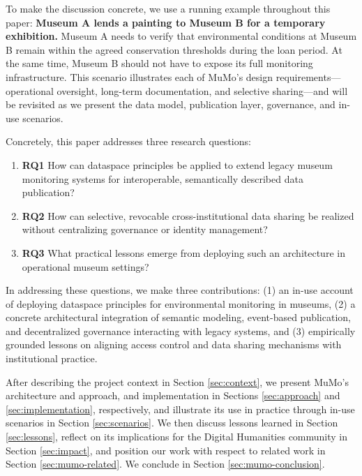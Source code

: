 To make the discussion concrete, we use a running example throughout
this paper: \textbf{Museum A lends a painting to Museum B for a
temporary exhibition.} Museum A needs to verify that environmental
conditions at Museum B remain within the agreed conservation thresholds
during the loan period. At the same time, Museum B should not have to
expose its full monitoring infrastructure. This scenario illustrates
each of MuMo's design requirements---operational oversight, long-term
documentation, and selective sharing---and will be revisited as we
present the data model, publication layer, governance, and in-use
scenarios.

Concretely, this paper addresses three research questions:

\begin{enumerate}
\def\labelenumi{\arabic{enumi}.}
\tightlist
\item
  \textbf{RQ1} How can dataspace principles be applied to extend legacy
  museum monitoring systems for interoperable, semantically described
  data publication?
\item
  \textbf{RQ2} How can selective, revocable cross-institutional data
  sharing be realized without centralizing governance or identity
  management?
\item
  \textbf{RQ3} What practical lessons emerge from deploying such an
  architecture in operational museum settings?
\end{enumerate}

In addressing these questions, we make three contributions: (1) an
in-use account of deploying dataspace principles for environmental
monitoring in museums, (2) a concrete architectural integration of
semantic modeling, event-based publication, and decentralized governance
interacting with legacy systems, and (3) empirically grounded lessons on
aligning access control and data sharing mechanisms with institutional
practice.

After describing the project context in Section \ref{sec:context}, we
present MuMo's architecture and approach, and implementation in Sections
\ref{sec:approach} and \ref{sec:implementation}, respectively, and
illustrate its use in practice through in-use scenarios in Section
\ref{sec:scenarios}. We then discuss lessons learned in Section
\ref{sec:lessons}, reflect on its implications for the Digital
Humanities community in Section \ref{sec:impact}, and position our work
with respect to related work in Section \ref{sec:mumo-related}. We conclude
in Section \ref{sec:mumo-conclusion}.

